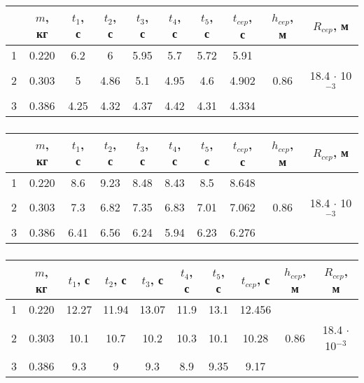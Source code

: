 \begin{tabular}{|c| c| c| c| c| c| c| c| c| c|}
	\hline
	\No & $m$, кг & $t_1$, с & $t_2$, с & $t_3$, с &
	$t_4$, с & $t_5$, с & $t_{cep}$, с &
	$h_{cep}$, м & $R_{cep}$, м\\
	\hline

	1 & 0.220 & 6.2 & 6 & 5.95 & 5.7 & 5.72 & 5.91 & &  \\
	\cline{1-8}
	2 & 0.303 & 5 & 4.86 & 5.1 & 4.95 & 4.6 & 4.902 & 0.86 & 18.4 $\cdot$ 10$^{-3}$\\
	\cline{1-8}
	3 & 0.386 & 4.25 & 4.32 & 4.37 & 4.42 & 4.31 & 4.334 & & \\
	\hline

\end{tabular}

\subsubsection*{}

\begin{tabular}{|c| c| c| c| c| c| c| c| c| c|}
	\hline
	\No & $m$, кг & $t_1$, с & $t_2$, с & $t_3$, с &
	$t_4$, с & $t_5$, с & $t_{cep}$, с &
	$h_{cep}$, м & $R_{cep}$, м\\
	\hline

	1 & 0.220 & 8.6 & 9.23 & 8.48 & 8.43 & 8.5 & 8.648 & & \\
	\cline{1-8}
	2 & 0.303 & 7.3 & 6.82 & 7.35 & 6.83 & 7.01 & 7.062 & 0.86 & 18.4 $\cdot$ 10$^{-3}$\\
	\cline{1-8}
	3 & 0.386 & 6.41 & 6.56 & 6.24 & 5.94 & 6.23 & 6.276 & & \\
	\hline

\end{tabular}

\subsubsection*{}

\begin{tabular}{|c| c| c| c| c| c| c| c| c| c|}
	\hline
	\No & $m$, кг & $t_1$, с & $t_2$, с & $t_3$, с &
	$t_4$, с & $t_5$, с & $t_{cep}$, с &
	$h_{cep}$, м & $R_{cep}$, м\\
	\hline

	1 & 0.220 & 12.27 & 11.94 & 13.07 & 11.9 & 13.1 & 12.456 & & \\
	\cline{1-8}
	2 & 0.303 & 10.1 & 10.7 & 10.2 & 10.3 & 10.1 & 10.28 & 0.86 & 18.4 $\cdot$ 10$^{-3}$ \\
	\cline{1-8}
	3 & 0.386 & 9.3 & 9 & 9.3 & 8.9 & 9.35 & 9.17 & & \\
	\hline

\end{tabular}
